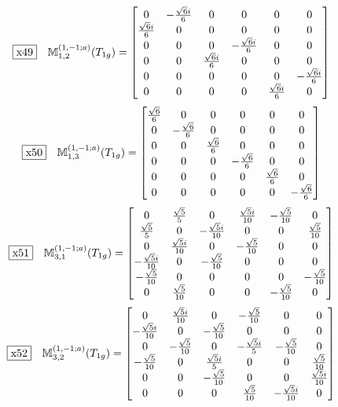 \documentclass[fleqn,10pt,landscape]{jsarticle}
\begin{document}
\begin{dmath*}
\fbox{x49}\quad \mathbb{M}_{1,2}^{(1,-1;a)}(T_{1g})=\begin{bmatrix} 0 & - \frac{\sqrt{6} i}{6} & 0 & 0 & 0 & 0 \\ \frac{\sqrt{6} i}{6} & 0 & 0 & 0 & 0 & 0 \\ 0 & 0 & 0 & - \frac{\sqrt{6} i}{6} & 0 & 0 \\ 0 & 0 & \frac{\sqrt{6} i}{6} & 0 & 0 & 0 \\ 0 & 0 & 0 & 0 & 0 & - \frac{\sqrt{6} i}{6} \\ 0 & 0 & 0 & 0 & \frac{\sqrt{6} i}{6} & 0 \end{bmatrix}
\end{dmath*}
\begin{dmath*}
\fbox{x50}\quad \mathbb{M}_{1,3}^{(1,-1;a)}(T_{1g})=\begin{bmatrix} \frac{\sqrt{6}}{6} & 0 & 0 & 0 & 0 & 0 \\ 0 & - \frac{\sqrt{6}}{6} & 0 & 0 & 0 & 0 \\ 0 & 0 & \frac{\sqrt{6}}{6} & 0 & 0 & 0 \\ 0 & 0 & 0 & - \frac{\sqrt{6}}{6} & 0 & 0 \\ 0 & 0 & 0 & 0 & \frac{\sqrt{6}}{6} & 0 \\ 0 & 0 & 0 & 0 & 0 & - \frac{\sqrt{6}}{6} \end{bmatrix}
\end{dmath*}
\begin{dmath*}
\fbox{x51}\quad \mathbb{M}_{3,1}^{(1,-1;a)}(T_{1g})=\begin{bmatrix} 0 & \frac{\sqrt{5}}{5} & 0 & \frac{\sqrt{5} i}{10} & - \frac{\sqrt{5}}{10} & 0 \\ \frac{\sqrt{5}}{5} & 0 & - \frac{\sqrt{5} i}{10} & 0 & 0 & \frac{\sqrt{5}}{10} \\ 0 & \frac{\sqrt{5} i}{10} & 0 & - \frac{\sqrt{5}}{10} & 0 & 0 \\ - \frac{\sqrt{5} i}{10} & 0 & - \frac{\sqrt{5}}{10} & 0 & 0 & 0 \\ - \frac{\sqrt{5}}{10} & 0 & 0 & 0 & 0 & - \frac{\sqrt{5}}{10} \\ 0 & \frac{\sqrt{5}}{10} & 0 & 0 & - \frac{\sqrt{5}}{10} & 0 \end{bmatrix}
\end{dmath*}
\begin{dmath*}
\fbox{x52}\quad \mathbb{M}_{3,2}^{(1,-1;a)}(T_{1g})=\begin{bmatrix} 0 & \frac{\sqrt{5} i}{10} & 0 & - \frac{\sqrt{5}}{10} & 0 & 0 \\ - \frac{\sqrt{5} i}{10} & 0 & - \frac{\sqrt{5}}{10} & 0 & 0 & 0 \\ 0 & - \frac{\sqrt{5}}{10} & 0 & - \frac{\sqrt{5} i}{5} & - \frac{\sqrt{5}}{10} & 0 \\ - \frac{\sqrt{5}}{10} & 0 & \frac{\sqrt{5} i}{5} & 0 & 0 & \frac{\sqrt{5}}{10} \\ 0 & 0 & - \frac{\sqrt{5}}{10} & 0 & 0 & \frac{\sqrt{5} i}{10} \\ 0 & 0 & 0 & \frac{\sqrt{5}}{10} & - \frac{\sqrt{5} i}{10} & 0 \end{bmatrix}
\end{dmath*}
\end{document}

